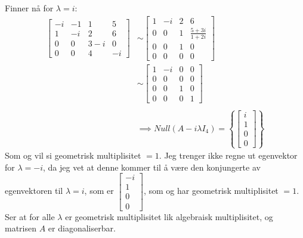 \documentclass[11pt, a4paper, norsk]{NTNUoving}
\begin{document}
\begin{oppgave}
\begin{punkt}
            Finner nå for $\lambda = i$:
            \begin{align*}
                \begin{bmatrix}
                    -i & -1 & 1 & 5 \\
                    1 & -i & 2 & 6 \\
                    0 & 0 & 3-i & 0 \\
                    0 & 0 & 4 & -i
                \end{bmatrix} &\sim \begin{bmatrix}
                1 & -i & 2 & 6 \\
                0 & 0 & 1 & \frac{5+3i}{1+2i} \\
                0 & 0 & 1 & 0 \\
                0 & 0 & 0 & 0
                \end{bmatrix}
                \\
                &\sim \begin{bmatrix}
                    1 & -i & 0 & 0 \\
                    0 & 0 & 0 & 0 \\
                    0 & 0 & 1 & 0 \\
                    0 & 0 & 0 & 1
                \end{bmatrix}
                \\
                \\
                &\implies Null(A - i\lambda I_4) = \left\{\begin{bmatrix}
                    i \\
                    1 \\
                    0 \\
                    0
                \end{bmatrix}\right\}
            \end{align*}
            Som og vil si geometrisk multiplisitet $=1$. Jeg trenger ikke regne ut egenvektor for $\lambda = -i$, da jeg vet at denne kommer til å være den konjungerte av egenvektoren til $\lambda = i$, som er $\begin{bmatrix}
                -i \\
                1 \\
                0 \\
                0
            \end{bmatrix}$, som og har geometrisk multiplisitet $=1$. Ser at for alle $\lambda$ er geometrisk multiplisitet lik algebraisk multiplisitet, og matrisen $A$ er diagonaliserbar.
        \end{punkt}
    \end{oppgave}
\end{document}
